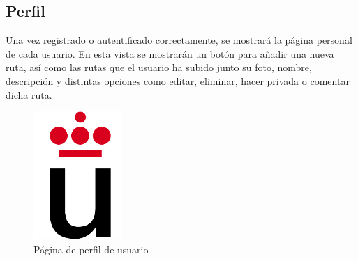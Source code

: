 \documentclass[11pt,a4paper]{article}
\begin{document}
\subsection{Perfil}
Una vez registrado o autentificado correctamente, se mostrará  la página personal de cada usuario. En esta vista se mostrarán un botón para añadir una nueva ruta, así como las rutas que el usuario ha subido junto su foto, nombre, descripción y distintas opciones como editar, eliminar, hacer privada o comentar dicha ruta. 
\begin{figure}[h]
\centering
  \includegraphics[width=0.3\textwidth]{./imagenes/logoURJC}
  \caption{Página de perfil de usuario}
  \label{fig: Página de perfil de usuario}
\end{figure}
\end{document}
